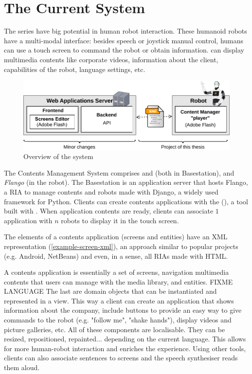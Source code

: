 \section{The Current System}
The  series have big potential in human robot interaction. 
These humanoid robots have a multi-modal interface: besides speech or joystick manual control, humans can use a touch screen to command the robot or obtain information.
 can display multimedia contents like corporate videos, information about the client, capabilities of the robot, language settings, etc.

\begin{figure}[htb]
    
    \centering
    \includegraphics[width=14cm]{figures/intro-system-overview}
    \caption{Overview of the system}
    \label{fig:intro-system-overview}
\end{figure}

The Contents Management System comprises \emph{\flangofe} and \emph{\flangobe} (both in Basestation), and \emph{Flango \cm} (in the robot).
The Basestation is an application server that hosts Flango, a \ac{RIA} to manage contents and robots made with Django, a widely used framework for Python. 
Clients can create contents applications  with the \flangofe (\se), a tool built with \flash .
When application contents are ready, clients can associate $1$ application with $n$ robots to display it in the touch screen.



The elements of a contents application (screens and entities) have an \ac{XML} representation (\ref{example-screen-xml}), an approach similar to popular projects (e.g. Android, NetBeans) and even, in a sense, all \acp{RIA} made with \ac{HTML}.

A contents application is essentially a set of screens, navigation multimedia contents that users can manage with the media library, and entities. 
FIXME LANGUAGE The last are domain objects that can be instantiated and represented in a view. 
This way a client can create an application that shows information about the company, include buttons to provide an easy way to give commands to the robot (e.g. "follow me", "shake hands"), display videos and picture galleries, etc.
All of these components are localisable. 
They can be resized, repositioned, repainted... depending on the current language.
This allows for more human-robot interaction and enriches the experience. 
Using other tools, clients can also associate sentences to screens and the speech synthesiser reads them aloud.

